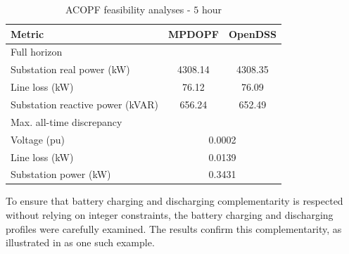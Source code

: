 \documentclass[../../outputs/main.tex]{subfiles}
\begin{document}
\begin{table}[H]
    \centering
    \caption{ACOPF feasibility analyses - $5$ hour}
    \begin{tabular}{|l|c|c|}
    \hline
    \textbf{Metric} & \textbf{MPDOPF} & \textbf{OpenDSS} \\ \hline
    Full horizon  & \multicolumn{2}{c|}{} \\ \hline
    \quad Substation real power (kW) & 4308.14 & 4308.35 \\ \hline
    \quad Line loss (kW) & 76.12 & 76.09 \\ \hline
    \quad Substation reactive power (kVAR) & 656.24 & 652.49 \\ \hline
    Max. all-time discrepancy & \multicolumn{2}{c|}{} \\ \hline
    \quad Voltage (pu) & \multicolumn{2}{c|}{0.0002} \\ \hline
    \quad Line loss (kW) & \multicolumn{2}{c|}{0.0139} \\ \hline
    \quad Substation power (kW) & \multicolumn{2}{c|}{0.3431} \\ \hline
    \end{tabular}
    \label{table:feas-5-20-30}
    \vspace{-3mm}
\end{table}


To ensure that battery charging and discharging complementarity is respected without relying on integer constraints, the battery charging and discharging profiles were carefully examined. The results confirm this complementarity, as illustrated in  as one such example.
\end{document}
